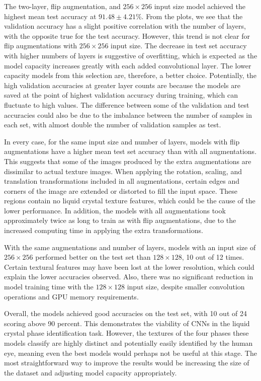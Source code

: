 \documentclass[12pt]{article}
\begin{document}
The two-layer, flip augmentation, and $256 \times 256$ input size model achieved the highest mean test accuracy at $91.48\pm4.21$\%. From the plots, we see that the validation accuracy has a slight positive correlation with the number of layers, with the opposite true for the test accuracy. However, this trend is not clear for flip augmentations with $256 \times 256$ input size. The decrease in test set accuracy with higher numbers of layers is suggestive of overfitting, which is expected as the model capacity increases greatly with each added convolutional layer. The lower capacity models from this selection are, therefore, a better choice. Potentially, the high validation accuracies at greater layer counts are because the models are saved at the point of highest validation accuracy during training, which can fluctuate to high values. The difference between some of the validation and test accuracies could also be due to the imbalance between the number of samples in each set, with almost double the number of validation samples as test.

In every case, for the same input size and number of layers, models with flip augmentations have a higher mean test set accuracy than with all augmentations. This suggests that some of the images produced by the extra augmentations are dissimilar to actual texture images. When applying the rotation, scaling, and translation transformations included in all augmentations, certain edges and corners of the image are extended or distorted to fill the input space. These regions contain no liquid crystal texture features, which could be the cause of the lower performance. In addition, the models with all augmentations took approximately twice as long to train as with flip augmentations, due to the increased computing time in applying the extra transformations.

With the same augmentations and number of layers, models with an input size of $256 \times 256$ performed better on the test set than $128 \times 128$, 10 out of 12 times. Certain textural features may have been lost at the lower resolution, which could explain the lower accuracies observed. Also, there was no significant reduction in model training time with the $128 \times 128$ input size, despite smaller convolution operations and GPU memory requirements.

Overall, the models achieved good accuracies on the test set, with 10 out of 24 scoring above 90 percent. This demonstrates the viability of CNNs in the liquid crystal phase identification task. However, the textures of the four phases these models classify are highly distinct and potentially easily identified by the human eye, meaning even the best models would perhaps not be useful at this stage. The most straightforward way to improve the results would be increasing the size of the dataset and adjusting model capacity appropriately.
\end{document}
